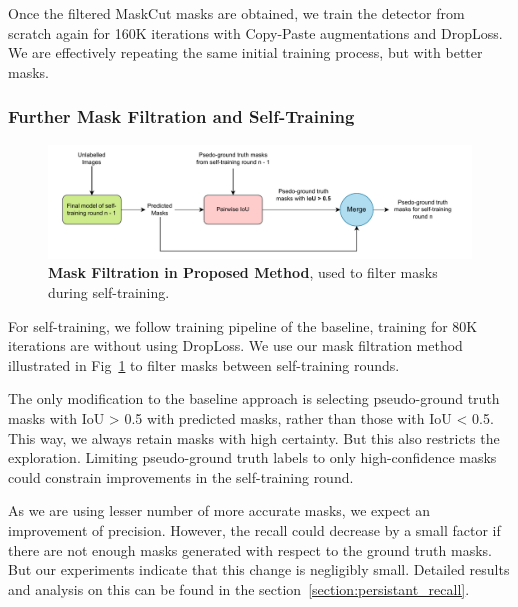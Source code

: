 Once the filtered MaskCut masks are obtained, we train the detector from scratch again for 160K iterations with Copy-Paste augmentations and DropLoss. We are effectively repeating the same initial training process, but with better masks.

\subsubsection{Further Mask Filtration and Self-Training}
\begin{figure}
	\centering
	\includegraphics[width=1\textwidth]{Images/main/our_filtration_self_training.pdf}
	\caption[\textbf{Mask Filtration in Proposed Method in Self-Training}]{\textbf{Mask Filtration in Proposed Method}, used to filter masks during self-training.}
	\label{fig:our_mask_filtration_self_training}
\end{figure}


 For self-training, we follow training pipeline of the baseline, training for 80K iterations are without using DropLoss. We use our mask filtration method illustrated in Fig~\ref{fig:our_mask_filtration_self_training} to filter masks between self-training rounds. 
 
 The only modification to the baseline approach is selecting pseudo-ground truth masks with IoU > 0.5 with predicted masks, rather than those with IoU < 0.5. This way, we always retain masks with high certainty. But this also restricts the exploration. Limiting pseudo-ground truth labels to only high-confidence masks could constrain improvements in the self-training round. 
 
 
 
 As we are using lesser number of more accurate masks, we expect an improvement of precision. However, the recall could decrease by a small factor if there are not enough masks generated with respect to the ground truth masks. But our experiments indicate that this change is negligibly small. Detailed results and analysis on this can be found in the section~\ref{section:persistant_recall}.



